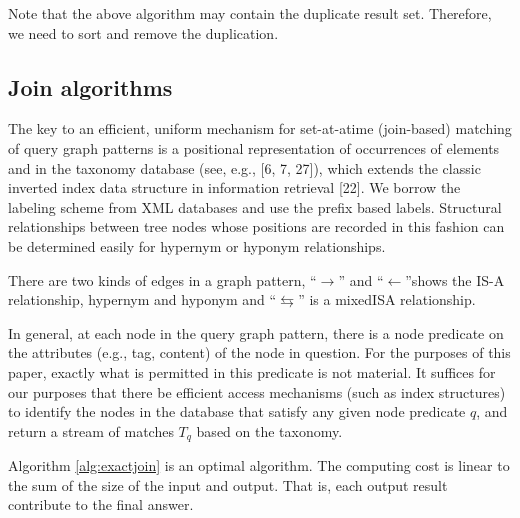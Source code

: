 Note that the above algorithm may contain the duplicate result set. Therefore, we need to sort and remove the duplication.



\subsection{Join algorithms}

The key to an efficient, uniform mechanism for set-at-atime
(join-based) matching of query graph patterns is a positional
representation of occurrences of  elements and in the taxonomy database (see, e.g., [6, 7, 27]),
which extends the classic inverted index data structure in information retrieval [22]. We borrow the labeling scheme from XML databases and use the prefix based labels. Structural relationships between tree nodes whose positions
are recorded in this fashion can be determined easily for hypernym or hyponym relationships.

There are two kinds of edges in a graph pattern, ``$\rightarrow$'' and ``$\leftarrow$''shows the IS-A relationship, hypernym and hyponym and ``$\leftrightarrows$'' is a mixedISA relationship.

In general, at each node in the query graph pattern, there is
a node predicate on the attributes (e.g., tag, content) of the
node in question. For the purposes of this paper, exactly
what is permitted in this predicate is not material.  It suffices
for our purposes that there be efficient access mechanisms
(such as index structures) to identify the nodes in the
database that satisfy any given node predicate $q$, and
return a stream of matches $T_q$ based on the taxonomy.

\begin{theorem}  Algorithm \ref{alg:exactjoin} is an optimal algorithm. The computing cost is linear to the sum of the size of the input and output. That is, each output result contribute to the final answer.
\end{theorem}



